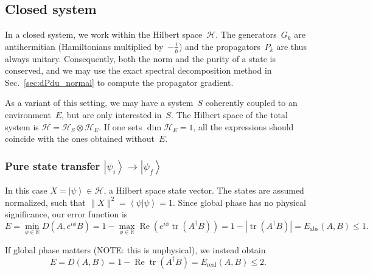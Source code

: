 \documentclass[aps, pra, a4paper, longbibliography, superscriptaddress]{revtex4-1}
\newcommand{\be}{\begin{equation}}
\newcommand{\ee}{\end{equation}}
\newcommand{\R}{{\mathbb R}}  %
\newcommand{\ket}[1]{\left| #1 \right \rangle}
\newcommand{\braket}[2]{\left \langle #1 | #2 \right \rangle}
\newcommand{\ketbra}[2]{\left| #1 \right \rangle \left \langle #2 \right|}
\newcommand{\hilb}[1]{\mathcal{#1}}
\DeclareMathOperator{\tr}{tr}
\DeclareMathOperator{\re}{Re}
\DeclareMathOperator{\cvec}{vec}
\begin{document}
\subsection{Closed system}

In a closed system, we work within the Hilbert space~$\hilb{H}$.
The generators~$G_k$ are antihermitian (Hamiltonians multiplied by~$-\frac{i}{\hbar}$)
and the propagators~$P_k$ are thus always
unitary. Consequently, both the norm and the purity of a state is conserved,
and we may use the exact spectral decomposition method in
Sec.~\ref{sec:dPdu_normal} to compute the propagator gradient.

As a variant of this setting,
we may have a system~$S$ coherently coupled to an
environment~$E$, but are only interested in~$S$.
The Hilbert space of the total system is
$\hilb{H} = \hilb{H}_S \otimes \hilb{H}_E$.
If one sets $\dim \hilb{H}_E = 1$, all the expressions should coincide with the ones obtained without~$E$.


\subsubsection{Pure state transfer $\ket{\psi_i} \to \ket{\psi_f}$}
\label{sec:closed-pure}

In this case $X = \ket{\psi} \in \hilb{H}$, a Hilbert space state vector.
The states are assumed normalized, such that $\|X\|^2 = \braket{\psi}{\psi} = 1$.
Since global phase has no physical significance, our error function is
\be
E = \min_{\phi \in \R} D(A, e^{i \phi} B)
= 1 -\max_{\phi \in \R} \re \left( e^{i \phi} \tr(A^\dagger B)\right)
= 1 -|\tr(A^\dagger B)|
= E_\text{abs}(A, B) \le 1.
\ee

\begin{comment}
This result can also be obtained using the mixed state formula in the
vec representation, with $\rho = \ketbra{\psi}{\psi}$ and thus
$X = \cvec(\rho) = \ket{\psi^*} \otimes \ket{\psi}$.
The fidelity diagram breaks into two pieces and
we obtain
\be
f(A, B)
= (\re) \left|(\tr)(A^\dagger  B) \right|^2.
\ee
with $0 \le f(A, B) \le 1$.
Thus the problem simplifies back into Hilbert space
(albeit with an extra absolute value squared in the expression for the fidelity), and we may equivalently
choose $X = \ket{\psi}$.
\end{comment}


If global phase matters (NOTE: this is unphysical), we instead obtain
\be
E
= D(A, B)
= 1 -\re \tr(A^\dagger B)
= E_\text{real}(A, B) \le 2.
\ee
\end{document}
